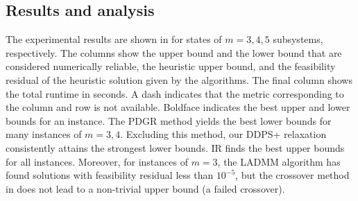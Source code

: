 \documentclass[smallextended]{svjour3}
\newcommand{\1}{\mathbf{1}}
\begin{document}
 \subsection{Results and analysis}

The experimental results are shown in  for states of $m=3,4,5$ subsystems, respectively. The columns show the upper bound and the lower bound that are considered numerically reliable, the heuristic upper bound, and the feasibility residual of the heuristic solution given by the algorithms. The final column shows the total runtime in seconds. A dash indicates that the metric corresponding to the column and row is not available. Boldface indicates the best upper and lower bounds for an instance. The PDGR method yields the best lower bounds for  many instances of $m=3,4$. Excluding this method, our DDPS+ relaxation consistently attains the strongest lower bounds.
 IR finds the best upper bounds for all instances. Moreover, for instances of $m=3$, the LADMM algorithm has found solutions with feasibility residual less than $10^{-5}$, but the crossover method in  does not lead to a non-trivial upper bound (a failed crossover).
\end{document}
